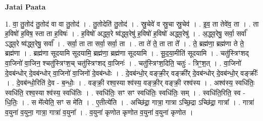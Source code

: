 \documentclass[17pt]{extarticle}
\begin{document}
\textbf{Jatai Paata} \newline

1. वा॒ तु॒तोद॑ तु॒तोद॑ वा वा तु॒तोद॑ । . तु॒तोदेति॑ तु॒तोद॑ । . स्रु॒चेवे॑ व स्रु॒चा स्रु॒चेव॑ । . इ॒व॒ ता तेवे॑व॒ ता । . ता ह॒विषो॑ ह॒विष॒ स्ता ता ह॒विषः॑ । . ह॒विषो॑ अद्ध्व॒रे ष्व॑द्ध्व॒रेषु॑ ह॒विषो॑ ह॒विषो॑ अद्ध्व॒रेषु॑ । . अ॒द्ध्व॒रेषु॒ सर्वा॒ सर्वा᳚ ऽद्ध्व॒रे ष्व॑द्ध्व॒रेषु॒ सर्वा᳚ । . सर्वा॒ ता ता सर्वा॒ सर्वा॒ ता । . ता ते॑ ते॒ ता ता ते᳚ । . ते॒ ब्रह्म॑णा॒ ब्रह्म॑णा ते ते॒ ब्रह्म॑णा । . ब्रह्म॑णा सूदयामि सूदयामि॒ ब्रह्म॑णा॒ ब्रह्म॑णा सूदयामि । . सू॒द॒या॒मीति॑ सूदयामि । . चतु॑स्त्रिꣳशद् वा॒जिनो॑ वा॒जिन॒ श्चतु॑स्त्रिꣳश॒च् चतु॑स्त्रिꣳशद् वा॒जिनः॑ । . चतु॑स्त्रिꣳश॒दिति॒ चतुः॑ - त्रिꣳ॒॒श॒त् । . वा॒जिनो॑ दे॒वब॑न्धोर् दे॒वब॑न्धोर् वा॒जिनो॑ वा॒जिनो॑ दे॒वब॑न्धोः । . दे॒वब॑न्धो॒र् वङ्क्री॒र् वङ्क्री᳚र् दे॒वब॑न्धोर् दे॒वब॑न्धो॒र् वङ्क्रीः᳚ । . दे॒वब॑न्धो॒रिति॑ दे॒व - ब॒न्धोः॒ । . वङ्क्री॒ रश्व॒स्या श्व॑स्य॒ वङ्क्री॒र् वङ्क्री॒ रश्व॑स्य । . अश्व॑स्य॒ स्वधि॑तिः॒ स्वधि॑ति॒ रश्व॒स्या श्व॑स्य॒ स्वधि॑तिः । . स्वधि॑तिः॒ सꣳ सꣳ स्वधि॑तिः॒ स्वधि॑तिः॒ सम् । . स्वधि॑ति॒रिति॒ स्व - धि॒तिः॒ । . स मे᳚त्येति॒ सꣳ स मे॑ति । . ए॒तीत्ये॑ति । . अच्छि॑द्रा॒ गात्रा॒ गात्रा ऽच्छि॒द्रा ऽच्छि॑द्रा॒ गात्रा᳚ । . गात्रा॑ व॒युना॑ व॒युना॒ गात्रा॒ गात्रा॑ व॒युना᳚ । . व॒युना॑ कृणोत कृणोत व॒युना॑ व॒युना॑ कृणोत । \newline
\end{document}

